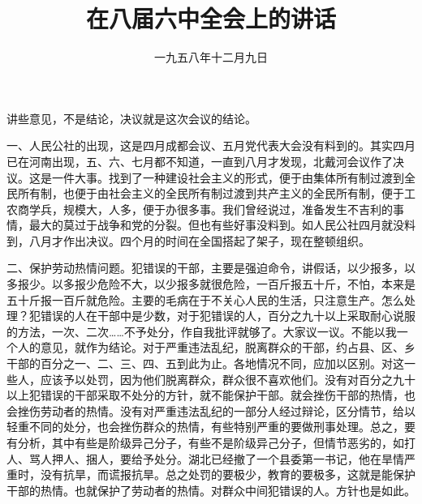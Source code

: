 
\title{在八届六中全会上的讲话}
\date{一九五八年十二月九日}
\maketitle


讲些意见，不是结论，决议就是这次会议的结论。

一、人民公社的出现，这是四月成都会议、五月党代表大会没有料到的。其实四月已在河南出现，五、六、七月都不知道，一直到八月才发现，北戴河会议作了决议。这是一件大事。找到了一种建设社会主义的形式，便于由集体所有制过渡到全民所有制，也便于由社会主义的全民所有制过渡到共产主义的全民所有制，便于工农商学兵，规模大，人多，便于办很多事。我们曾经说过，准备发生不吉利的事情，最大的莫过于战争和党的分裂。但也有些好事没料到。如人民公社四月就没料到，八月才作出决议。四个月的时间在全国搭起了架子，现在整顿组织。

二、保护劳动热情问题。犯错误的干部，主要是强迫命令，讲假话，以少报多，以多报少。以多报少危险不大，以少报多就很危险，一百斤报五十斤，不怕，本来是五十斤报一百斤就危险。主要的毛病在于不关心人民的生活，只注意生产。怎么处理？犯错误的人在干部中是少数，对于犯错误的人，百分之九十以上采取耐心说服的方法，一次、二次……不予处分，作自我批评就够了。大家议一议。不能以我一个人的意见，就作为结论。对于严重违法乱纪，脱离群众的干部，约占县、区、乡干部的百分之一、二、三、四、五到此为止。各地情况不同，应加以区别。对这一些人，应该予以处罚，因为他们脱离群众，群众很不喜欢他们。没有对百分之九十以上犯错误的干部采取不处分的方针，就不能保护干部。就会挫伤干部的热情，也会挫伤劳动者的热情。没有对严重违法乱纪的一部分人经过辩论，区分情节，给以轻重不同的处分，也会挫伤群众的热情，有些特别严重的要做刑事处理。总之，要有分析，其中有些是阶级异己分子，有些不是阶级异己分子，但情节恶劣的，如打人、骂人押人、捆人，要给予处分。湖北已经撤了一个县委第一书记，他在旱情严重时，没有抗旱，而谎报抗旱。总之处罚的要极少，教育的要极多，这就是能保护干部的热情。也就保护了劳动者的热情。对群众中间犯错误的人。方针也是如此。

